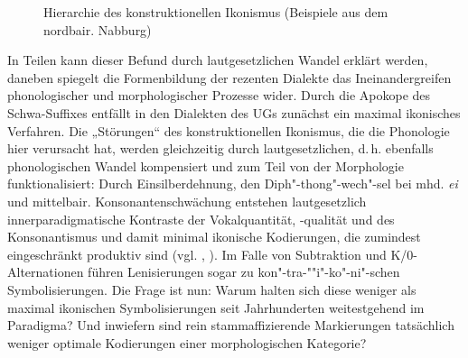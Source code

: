\begin{figure}%
\caption{\label{fig:10.1}Hierarchie des konstruktionellen Ikonismus (Beispiele aus dem nordbair. Nabburg)}
\label{fig:18}
\end{figure}

In Teilen kann dieser Befund durch lautgesetzlichen Wandel erklärt werden, daneben spiegelt die Formenbildung der rezenten Dialekte das Ineinandergreifen phonologischer und morphologischer Prozesse wider. Durch die Apokope des Schwa-Suffixes entfällt in den Dialekten des UGs zunächst ein maximal ikonisches Verfahren. Die „Störungen“ \citep[43]{Mayerthaler1981} des konstruktionellen Ikonismus, die die Phonologie hier verursacht hat, werden gleichzeitig durch lautgesetzlichen, d.\,h. ebenfalls phonologischen Wandel kompensiert und zum Teil von der Morphologie funktionalisiert: Durch Einsilberdehnung, den Diph"-thong"-wech"-sel bei mhd. \textit{ei} und mittelbair. Konsonantenschwächung entstehen lautgesetzlich innerparadigmatische Kontraste der Vokalquantität, -qualität und des Konsonantismus und damit minimal ikonische Kodierungen, die zumindest eingeschränkt produktiv sind (vgl. \citealt[98]{Harnisch2016}, \citealt[43--44]{Rowley1997}). Im Falle von Subtraktion und K/0-Alternationen führen Lenisierungen sogar zu kon"-tra-""i"-ko"-ni"-schen Symbolisierungen. Die Frage ist nun: Warum halten sich diese weniger als maximal ikonischen Symbolisierungen seit Jahrhunderten weitestgehend im Paradigma? Und inwiefern sind rein stammaffizierende Markierungen tatsächlich weniger optimale Kodierungen einer morphologischen Kategorie?

